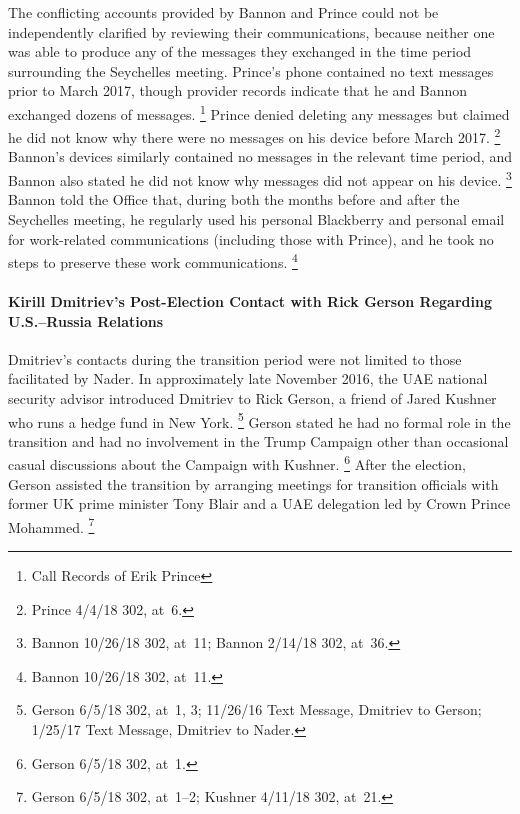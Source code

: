The conflicting accounts provided by Bannon and Prince could not be independently clarified by reviewing their communications, because neither one was able to produce any of the messages they exchanged in the time period surrounding the Seychelles meeting.
Prince's phone contained no text messages prior to March 2017, though provider records indicate that he and Bannon exchanged dozens of messages.%
\footnote{Call Records of Erik Prince }
Prince denied deleting any messages but claimed he did not know why there were no messages on his device before March 2017.%
\footnote{Prince 4/4/18 302, at~6.}
Bannon's devices similarly contained no messages in the relevant time period, and Bannon also stated he did not know why messages did not appear on his device.%
\footnote{Bannon 10/26/18 302, at~11;
Bannon 2/14/18 302, at~36.}
Bannon told the Office that, during both the months before and after the Seychelles meeting, he regularly used his personal Blackberry and personal email for work-related communications (including those with Prince), and he took no steps to preserve these work communications.%
\footnote{Bannon 10/26/18 302, at~11.}

\paragraph{Kirill Dmitriev's Post-Election Contact with Rick Gerson Regarding U.S.--Russia Relations}

Dmitriev's contacts during the transition period were not limited to those facilitated by Nader.
In approximately late November 2016, the UAE national security advisor introduced Dmitriev to Rick Gerson, a friend of Jared Kushner who runs a hedge fund in New York.%
\footnote{Gerson 6/5/18 302, at~1, 3;
11/26/16 Text Message, Dmitriev to Gerson;
1/25/17 Text Message, Dmitriev to Nader.}
Gerson stated he had no formal role in the transition and had no involvement in the Trump Campaign other than occasional casual discussions about the Campaign with Kushner.%
\footnote{Gerson 6/5/18 302, at~1.}
After the election, Gerson assisted the transition by arranging meetings for transition officials with former UK prime minister Tony Blair and a UAE delegation led by Crown Prince Mohammed.%
\footnote{Gerson 6/5/18 302, at~1--2;
Kushner 4/11/18 302, at~21.}

